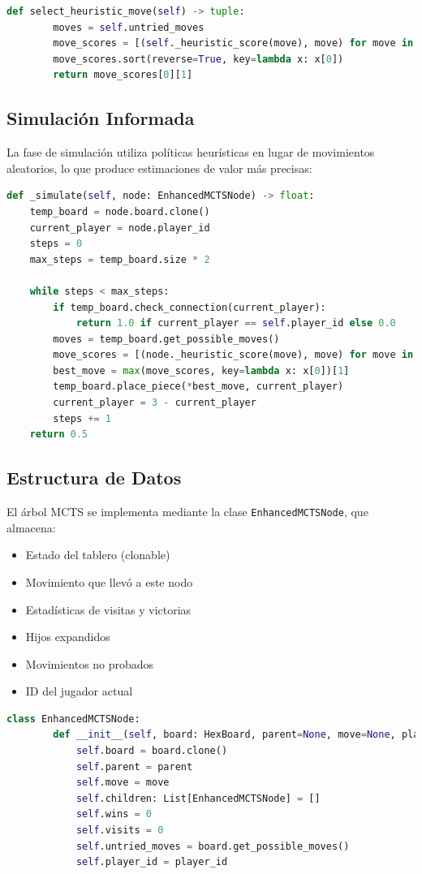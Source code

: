 \documentclass[a4paper, 12pt]{article}
\begin{document}
\begin{lstlisting}[language=Python,caption=Función de expansión heurística]
	def select_heuristic_move(self) -> tuple:
		moves = self.untried_moves
		move_scores = [(self._heuristic_score(move), move) for move in moves]
		move_scores.sort(reverse=True, key=lambda x: x[0])
		return move_scores[0][1]
\end{lstlisting}

\subsection{Simulación Informada}
La fase de simulación utiliza políticas heurísticas en lugar de movimientos aleatorios, lo que produce estimaciones de valor más precisas:

\begin{lstlisting}[language=Python,caption=Simulación basada en heurísticas]
	def _simulate(self, node: EnhancedMCTSNode) -> float:
	temp_board = node.board.clone()
	current_player = node.player_id
	steps = 0
	max_steps = temp_board.size * 2
	
	while steps < max_steps:
		if temp_board.check_connection(current_player):
			return 1.0 if current_player == self.player_id else 0.0
		moves = temp_board.get_possible_moves()
		move_scores = [(node._heuristic_score(move), move) for move in moves]
		best_move = max(move_scores, key=lambda x: x[0])[1]
		temp_board.place_piece(*best_move, current_player)
		current_player = 3 - current_player
		steps += 1
	return 0.5
\end{lstlisting}

\subsection{Estructura de Datos}
El árbol MCTS se implementa mediante la clase \texttt{EnhancedMCTSNode}, que almacena:

\begin{itemize}
	\item Estado del tablero (clonable)
	\item Movimiento que llevó a este nodo
	\item Estadísticas de visitas y victorias
	\item Hijos expandidos
	\item Movimientos no probados
	\item ID del jugador actual
\end{itemize}

\begin{lstlisting}[language=Python,caption=Estructura del nodo MCTS]
	class EnhancedMCTSNode:
		def __init__(self, board: HexBoard, parent=None, move=None, player_id: int = 1):
			self.board = board.clone()
			self.parent = parent
			self.move = move
			self.children: List[EnhancedMCTSNode] = []
			self.wins = 0
			self.visits = 0
			self.untried_moves = board.get_possible_moves()
			self.player_id = player_id
\end{lstlisting}
\end{document}
